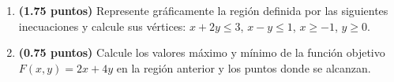 
\begin{enumerate}[label=\alph*)]
\item \textbf{(1.75 puntos)} Represente gráficamente la región definida por las siguientes inecuaciones y calcule sus vértices: $x+2y\leq3$, $x-y\leq1$, $x\geq-1$, $y\geq0$.
\item \textbf{(0.75 puntos)} Calcule los valores máximo y mínimo de la función objetivo $F(x,y)=2x+4y$ en la región anterior y los puntos donde se alcanzan.
\end{enumerate}

